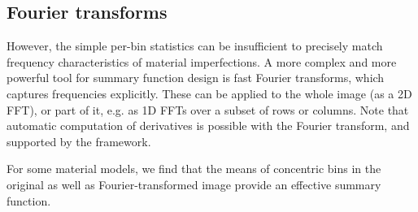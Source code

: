 \subsection{Fourier transforms}

However, the simple per-bin statistics can be insufficient to precisely match frequency characteristics of material imperfections. A more complex and more powerful tool for summary function design is fast Fourier transforms, which captures frequencies explicitly. These can be applied to the whole image (as a 2D FFT), or part of it, e.g. as 1D FFTs over a subset of rows or columns. Note that automatic computation of derivatives is possible with the Fourier transform, and supported by the \torch framework.

For some material models, we find that the means of concentric bins in the original as well as Fourier-transformed image provide an effective summary function.




